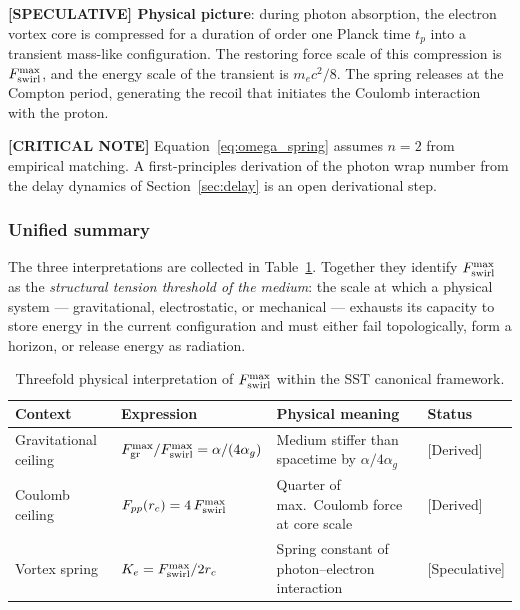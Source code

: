 \documentclass[11pt]{article}
\theoremstyle{definition}
\theoremstyle{plain}
\theoremstyle{remark}
\newcommand{\rc}{{r_c}}
\begin{document}
        \textbf{[SPECULATIVE] Physical picture}: during photon absorption, the electron vortex core is compressed for a duration of order one Planck time $t_p$ into a transient mass-like configuration. The restoring force scale of this compression is $F_{\rm swirl}^{\max}$, and the energy scale of the transient is $m_e c^2/8$. The spring releases at the Compton period, generating the recoil that initiates the Coulomb interaction with the proton.

        \textbf{[CRITICAL NOTE]} Equation~\eqref{eq:omega_spring} assumes $n=2$ from empirical matching. A first-principles derivation of the photon wrap number from the delay dynamics of Section~\ref{sec:delay} is an open derivational step.

        \subsubsection{Unified summary}

        The three interpretations are collected in Table~\ref{tab:Fmax_triple}. Together they identify $F_{\rm swirl}^{\max}$ as the \emph{structural tension threshold of the medium}: the scale at which a physical system --- gravitational, electrostatic, or mechanical --- exhausts its capacity to store energy in the current configuration and must either fail topologically, form a horizon, or release energy as radiation.

        \begin{table}[h]
        \centering
        \caption{Threefold physical interpretation of $F_{\rm swirl}^{\max}$ within the SST canonical framework.}
        \label{tab:Fmax_triple}
        \begin{tabular}{p{3.2cm}p{5.0cm}p{4.8cm}l}
        \hline
        \textbf{Context} & \textbf{Expression} & \textbf{Physical meaning} & \textbf{Status} \\
        \hline
        Gravitational ceiling &
          $F_{\rm gr}^{\max}/F_{\rm swirl}^{\max} = \alpha/(4\alpha_g)$ &
          Medium stiffer than spacetime by $\alpha/4\alpha_g$ &
          {[Derived]} \\[6pt]
        Coulomb ceiling &
          $F_{pp}(\rc) = 4\,F_{\rm swirl}^{\max}$ &
          Quarter of max.\ Coulomb force at core scale &
          {[Derived]} \\[6pt]
        Vortex spring &
          $K_e = F_{\rm swirl}^{\max}/2\rc$ &
          Spring constant of photon--electron interaction &
          {[Speculative]} \\
        \hline
        \end{tabular}
        \end{table}
\end{document}
